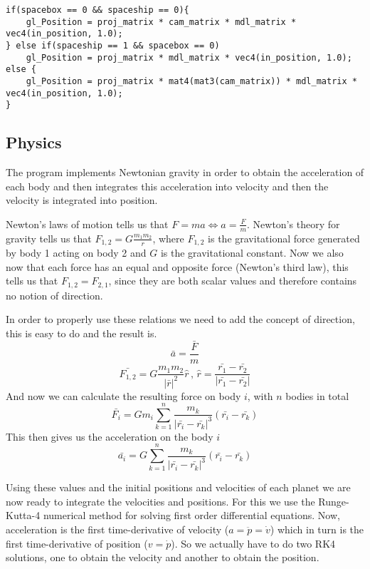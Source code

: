 \documentclass[a4paper,12pt]{article} \usepackage{graphicx}
\begin{document}
\begin{lstlisting}[caption={Vertex shader}, label={lst:vert}]
if(spacebox == 0 && spaceship == 0){
    gl_Position = proj_matrix * cam_matrix * mdl_matrix * vec4(in_position, 1.0);
} else if(spaceship == 1 && spacebox == 0)
    gl_Position = proj_matrix * mdl_matrix * vec4(in_position, 1.0);
else {
    gl_Position = proj_matrix * mat4(mat3(cam_matrix)) * mdl_matrix * vec4(in_position, 1.0);
} 
\end{lstlisting}

\subsection{Physics}
The program implements Newtonian gravity in order to obtain the acceleration of
each body and then integrates this acceleration into velocity and then the
velocity is integrated into position.

Newton's laws of motion tells us that $F=ma \Leftrightarrow a = \frac{F}{m}$.
Newton's theory for gravity tells us that $F_{1,2} = G\frac{m_1m_2}{r}$, where
$F_{1,2}$ is the gravitational force generated by body 1 acting on body 2 and
$G$ is the gravitational constant. Now we also now that each force has an equal
and opposite force (Newton's third law), this tells us that $F_{1,2} =
F_{2,1}$, since they are both scalar values and therefore contains no notion of
direction.

In order to properly use these relations we need to add the concept of
direction, this is easy to do and the result is.
\[
\bar{a} = \frac{\bar{F}}{m}
\]
\[
\bar{F_{1,2}} = G\frac{m_1m_2}{|\bar{r}|^2}\hat{r} \, , \, \hat{r} = \frac{\bar{r_1} - \bar{r_2}}{|\bar{r_1} - \bar{r_2}|}
\]
And now we can calculate the resulting force on body $i$, with $n$ bodies in total
\[
\bar{F_i} = G m_i\sum_{k=1}^n \frac{m_k}{|\bar{r_i} - \bar{r_k}|^3}\left( \bar{r_i} - \bar{r_k} \right)
\]
This then gives us the acceleration on the body $i$
\[
\bar{a_i} = G \sum_{k=1}^n \frac{m_k}{|\bar{r_i} - \bar{r_k}|^3}\left( \bar{r_i} - \bar{r_k} \right)
\]

Using these values and the initial positions and velocities of each planet we
are now ready to integrate the velocities and positions. For this we use the
Runge-Kutta-4 numerical method for solving first order differential equations.
Now, acceleration is the first time-derivative of velocity ($a=\ddot{p} =
\dot{v}$) which in turn is the first time-derivative of position ($v=\dot{p}$).
So we actually have to do two RK4 solutions, one to obtain the velocity and
another to obtain the position.
\end{document}
